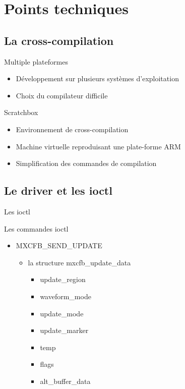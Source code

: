 \section{Points techniques}

\subsection{La cross-compilation}
\begin{frame}
\begin{block}{Multiple plateformes}
\begin{itemize}
\item Développement sur plusieurs systèmes d'exploitation
\item Choix du compilateur difficile
\end{itemize}
\end{block}

\begin{block}{Scratchbox}
\begin{itemize}
\item Environnement de cross-compilation
\item Machine virtuelle reproduisant une plate-forme ARM 
\item Simplification des commandes de compilation
\end{itemize}
\end{block}
\end{frame}


\subsection{Le driver et les ioctl}
\begin{frame}[fragile]{Les ioctl}
	\begin{block}{Les commandes ioctl}
		\begin{itemize}
			\item MXCFB\_SEND\_UPDATE 
				\begin{itemize}
					\item la structure mxcfb\_update\_data 
							\begin{itemize}
								\item update\_region
								\item waveform\_mode
								\item update\_mode
								\item update\_marker
								\item temp
								\item flags
								\item alt\_buffer\_data
							\end{itemize}
				\end{itemize}
		\end{itemize}
	\end{block}
\end{frame}

